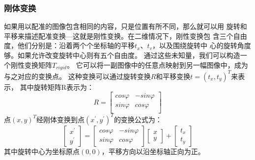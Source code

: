 \subsubsection{刚体变换}
如果用以配准的图像包含相同的内容，只是位置有所不同，那么就可以用
旋转和平移来描述配准变换---这就是刚性变换。在二维情况下，刚性变换包
含三个自由度，他们分别是：沿着两个个坐标轴的平移$t_x$、$t_v$，以及围绕旋转中
心的旋转角度够。如果允许改变旋转中心则有五个自由度。
通过这些未知量，我们可以构造一个刚性变换矩阵$T_{rigid}$。
它可以将一副图像中的任意点映射到另一幅图像中，成为与之对应的变换点。
这种变换可以通过旋转变换$R$和平移变换$t=(t_x,t_y)^T$来表示，
其中旋转矩阵R表示为：
\begin{equation}
  R=\begin{bmatrix}
    cos\varphi & -sin\varphi\\
    sin\varphi & cos\varphi\\
  \end{bmatrix}
\end{equation}
点$(x,y)^T$经刚体变换到点$(x^\prime,y^\prime)^T$的变换公式为：
\begin{equation}
  \begin{bmatrix}
    x^\prime\\
    y^\prime
  \end{bmatrix}=
  \begin{bmatrix}
    cos\varphi& -sin\varphi\\
    sin\varphi& cos\varphi
  \end{bmatrix}
  \begin{bmatrix}
    x\\
    y
  \end{bmatrix}+
  \begin{bmatrix}
    t_x\\
    t_y
  \end{bmatrix}
\end{equation}
其中旋转中心为坐标原点$(0,0)$，平移方向以沿坐标轴正向为正。
